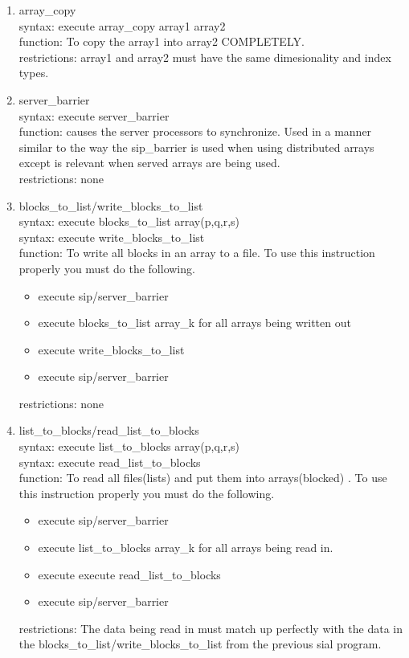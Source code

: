 \documentclass[12pt]{article}
\begin{document}
\begin{enumerate}
\item array\_copy\\
syntax: execute array\_copy array1 array2\\ 
function: To copy the array1 into array2 COMPLETELY.\\ 
restrictions: array1 and array2 must have the same dimesionality and index types.

\item server\_barrier\\
syntax: execute server\_barrier\\ 
function: causes the server processors to synchronize. Used in a manner similar to the 
way the sip\_barrier is used when using distributed arrays except is relevant when served 
arrays are being used.\\
restrictions: none

\item blocks\_to\_list/write\_blocks\_to\_list\\ 
syntax: execute blocks\_to\_list array(p,q,r,s)\\
syntax: execute write\_blocks\_to\_list\\
function: To write all blocks in an array to a file. To use this instruction properly you 
must do the following.
\begin{itemize} 
\item execute sip/server\_barrier
\item execute blocks\_to\_list array\_k for all arrays being written out
\item execute write\_blocks\_to\_list
\item execute sip/server\_barrier
\end{itemize} 
restrictions: none

\item list\_to\_blocks/read\_list\_to\_blocks\\ 
syntax: execute list\_to\_blocks array(p,q,r,s)\\ 
syntax: execute read\_list\_to\_blocks\\ 
function: To read all files(lists) and put them into arrays(blocked) . To use this 
instruction properly you must do the following.
\begin{itemize} 
\item execute sip/server\_barrier
\item execute list\_to\_blocks array\_k for all arrays being read in.
\item execute execute read\_list\_to\_blocks
\item execute sip/server\_barrier
\end{itemize} 
restrictions: The data being read in must match up perfectly with the data in the 
blocks\_to\_list/write\_blocks\_to\_list from the previous sial program.

\end{enumerate} 
\end{document}
